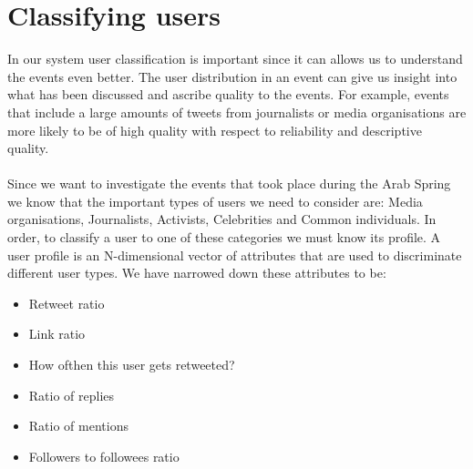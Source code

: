 \section{Classifying users}
In our system user classification is important since it can allows us to understand the events even better. The user distribution in an event can give us insight into what has been discussed and ascribe quality to the events. For example, events that include a large amounts of tweets from journalists or media organisations are more likely to be of high quality with respect to reliability and descriptive quality. \\\\
Since we want to investigate the events that took place during the Arab Spring we know that the important types of users we need to consider are: Media organisations, Journalists, Activists, Celebrities and Common individuals. In order, to classify a user to one of these categories we must know its profile. A user profile is an N-dimensional vector of attributes that are used to discriminate different user types. We have narrowed down these attributes to be:
\begin{itemize}
  \item Retweet ratio
  \item Link ratio
  \item How ofthen this user gets retweeted?
  \item Ratio of replies
  \item Ratio of mentions
  \item Followers to followees ratio 
\end{itemize}
